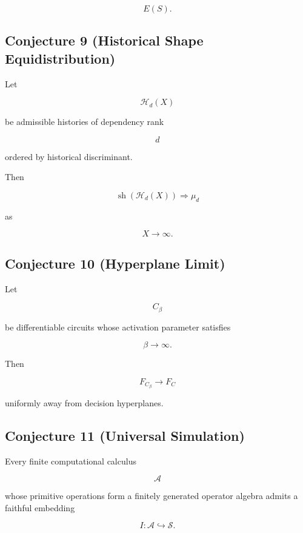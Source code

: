 \documentclass[12pt,oneside]{article}
\theoremstyle{definition}
\theoremstyle{remark}
\begin{document}
\[
E(S).
\]

\subsection*{Conjecture 9 (Historical Shape Equidistribution)}

Let

\[
\mathcal H_d(X)
\]

be admissible histories of dependency rank

\[
d
\]

ordered by historical discriminant.

Then

\[
\operatorname{sh}
(
\mathcal H_d(X)
)
\Rightarrow
\mu_d
\]

as

\[
X
\rightarrow
\infty.
\]

\subsection*{Conjecture 10 (Hyperplane Limit)}

Let

\[
C_\beta
\]

be differentiable circuits whose activation parameter satisfies

\[
\beta
\rightarrow
\infty.
\]

Then

\[
F_{C_\beta}
\rightarrow
F_C
\]

uniformly away from decision hyperplanes.

\subsection*{Conjecture 11 (Universal Simulation)}

Every finite computational calculus

\[
\mathcal A
\]

whose primitive operations form a finitely generated operator algebra admits
a faithful embedding

\[
I
:
\mathcal A
\hookrightarrow
\mathcal S.
\]
\end{document}
